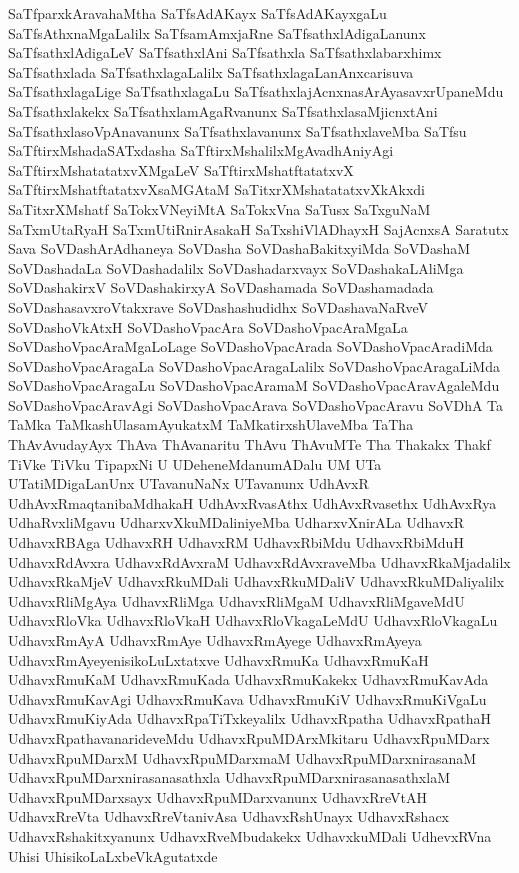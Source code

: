 {SaTfparxkAravahaMtha
SaTfsAdAKayx
SaTfsAdAKayxgaLu
SaTfsAthxnaMgaLalilx
SaTfsamAmxjaRne
SaTfsathxlAdigaLanunx
SaTfsathxlAdigaLeV
SaTfsathxlAni
SaTfsathxla
SaTfsathxlabarxhimx
SaTfsathxlada
SaTfsathxlagaLalilx
SaTfsathxlagaLanAnxcarisuva
SaTfsathxlagaLige
SaTfsathxlagaLu
SaTfsathxlajAcnxnasArAyasavxrUpaneMdu
SaTfsathxlakekx
SaTfsathxlamAgaRvanunx
SaTfsathxlasaMjicnxtAni
SaTfsathxlasoVpAnavanunx
SaTfsathxlavanunx
SaTfsathxlaveMba
SaTfsu
SaTftirxMshadaSATxdasha
SaTftirxMshalilxMgAvadhAniyAgi
SaTftirxMshatatatxvXMgaLeV
SaTftirxMshatftatatxvX
SaTftirxMshatftatatxvXsaMGAtaM
SaTitxrXMshatatatxvXkAkxdi
SaTitxrXMshatf
SaTokxVNeyiMtA
SaTokxVna
SaTusx
SaTxguNaM
SaTxmUtaRyaH
SaTxmUtiRnirAsakaH
SaTxshiVlADhayxH
SajAcnxsA
Saratutx
Sava
SoVDashArAdhaneya
SoVDasha
SoVDashaBakitxyiMda
SoVDashaM
SoVDashadaLa
SoVDashadalilx
SoVDashadarxvayx
SoVDashakaLAliMga
SoVDashakirxV
SoVDashakirxyA
SoVDashamada
SoVDashamadada
SoVDashasavxroVtakxrave
SoVDashashudidhx
SoVDashavaNaRveV
SoVDashoVkAtxH
SoVDashoVpacAra
SoVDashoVpacAraMgaLa
SoVDashoVpacAraMgaLoLage
SoVDashoVpacArada
SoVDashoVpacAradiMda
SoVDashoVpacAragaLa
SoVDashoVpacAragaLalilx
SoVDashoVpacAragaLiMda
SoVDashoVpacAragaLu
SoVDashoVpacAramaM
SoVDashoVpacAravAgaleMdu
SoVDashoVpacAravAgi
SoVDashoVpacArava
SoVDashoVpacAravu
SoVDhA
Ta
TaMka
TaMkashUlasamAyukatxM
TaMkatirxshUlaveMba
TaTha
ThAvAvudayAyx
ThAva
ThAvanaritu
ThAvu
ThAvuMTe
Tha
Thakakx
Thakf
TiVke
TiVku
TipapxNi
U
UDeheneMdanumADalu
UM
UTa
UTatiMDigaLanUnx
UTavanuNaNx
UTavanunx
UdhAvxR
UdhAvxRmaqtanibaMdhakaH
UdhAvxRvasAthx
UdhAvxRvasethx
UdhAvxRya
UdhaRvxliMgavu
UdharxvXkuMDaliniyeMba
UdharxvXnirALa
UdhavxR
UdhavxRBAga
UdhavxRH
UdhavxRM
UdhavxRbiMdu
UdhavxRbiMduH
UdhavxRdAvxra
UdhavxRdAvxraM
UdhavxRdAvxraveMba
UdhavxRkaMjadalilx
UdhavxRkaMjeV
UdhavxRkuMDali
UdhavxRkuMDaliV
UdhavxRkuMDaliyalilx
UdhavxRliMgAya
UdhavxRliMga
UdhavxRliMgaM
UdhavxRliMgaveMdU
UdhavxRloVka
UdhavxRloVkaH
UdhavxRloVkagaLeMdU
UdhavxRloVkagaLu
UdhavxRmAyA
UdhavxRmAye
UdhavxRmAyege
UdhavxRmAyeya
UdhavxRmAyeyenisikoLuLxtatxve
UdhavxRmuKa
UdhavxRmuKaH
UdhavxRmuKaM
UdhavxRmuKada
UdhavxRmuKakekx
UdhavxRmuKavAda
UdhavxRmuKavAgi
UdhavxRmuKava
UdhavxRmuKiV
UdhavxRmuKiVgaLu
UdhavxRmuKiyAda
UdhavxRpaTiTxkeyalilx
UdhavxRpatha
UdhavxRpathaH
UdhavxRpathavanarideveMdu
UdhavxRpuMDArxMkitaru
UdhavxRpuMDarx
UdhavxRpuMDarxM
UdhavxRpuMDarxmaM
UdhavxRpuMDarxnirasanaM
UdhavxRpuMDarxnirasanasathxla
UdhavxRpuMDarxnirasanasathxlaM
UdhavxRpuMDarxsayx
UdhavxRpuMDarxvanunx
UdhavxRreVtAH
UdhavxRreVta
UdhavxRreVtanivAsa
UdhavxRshUnayx
UdhavxRshacx
UdhavxRshakitxyanunx
UdhavxRveMbudakekx
UdhavxkuMDali
UdhevxRVna
Uhisi
UhisikoLaLxbeVkAgutatxde
}
